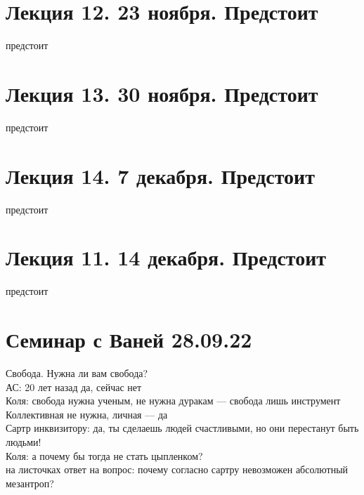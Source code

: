 \documentclass[a4paper,12pt]{article}
\begin{document}
\section{Лекция 12. 23 ноября. Предстоит} предстоит
\section{Лекция 13. 30 ноября. Предстоит} предстоит
\section{Лекция 14. 7 декабря. Предстоит} предстоит
\section{Лекция 11. 14 декабря. Предстоит} предстоит

\section{Семинар с Ваней 28.09.22}
Свобода. Нужна ли вам свобода?\\
АС: 20 лет назад да, сейчас нет \\
Коля: свобода нужна ученым, не нужна дуракам --- свобода лишь инструмент\\
Коллективная не нужна, личная --- да\\
Сартр инквизитору: да, ты сделаешь людей счастливыми, но они перестанут быть людьми!\\
Коля: а почему бы тогда не стать цыпленком?\\
на листочках ответ на вопрос: почему согласно сартру невозможен абсолютный мезантроп? 
\end{document}
